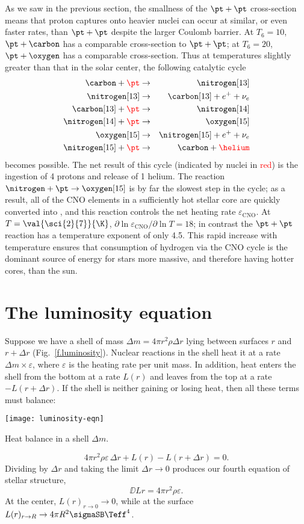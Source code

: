 As we saw in the previous section, the smallness of the $\pt+\pt$ cross-section means that proton captures onto heavier nuclei can occur at similar, or even faster rates, than $\pt+\pt$ despite the larger Coulomb barrier. 
At $T_{6} = 10$, $\pt+\carbon$ has a comparable cross-section to $\pt + \pt$; at $T_{6} = 20$, $\pt+\oxygen$ has a comparable cross-section.
Thus at temperatures slightly greater than that in the solar center, the following catalytic cycle 
\begin{eqnarray*}
\carbon + {\color{red}\pt} &\to& \nitrogen[13]\\
\nitrogen[13] &\to& \carbon[13] + e^{+} + \nu_{e}\\
\carbon[13] + {\color{red}\pt} &\to& \nitrogen[14]\\
\nitrogen[14] + {\color{red}\pt} &\to& \oxygen[15]\\
\oxygen[15] &\to& \nitrogen[15] + e^{+} + \nu_{e}\\
\nitrogen[15] + {\color{red}\pt} &\to& \carbon + {\color{red}\helium}
\end{eqnarray*}
becomes possible.
The net result of this cycle (indicated by nuclei in \textcolor{red}{red}) is the ingestion of 4 protons and release of 1 helium.
The reaction $\nitrogen+\pt\to\oxygen[15]$ is by far the slowest step in the cycle; as a result, all of the CNO elements in a sufficiently hot stellar core are quickly converted into \nitrogen, and this reaction controls the net heating rate $\varepsilon_{\mathrm{CNO}}$. At $T = \val{\sci{2}{7}}{\K}$, $\partial \ln \varepsilon_{\mathrm{CNO}}/\partial\ln T = 18$; in contrast the $\pt+\pt$ reaction has a temperature exponent of only 4.5. This rapid increase with temperature ensures that consumption of hydrogen via the CNO cycle is the dominant source of energy for stars more massive, and therefore having hotter cores, than the sun.


\section{The luminosity equation}

Suppose we have a shell of mass $\Delta m = 4\pi r^{2}\rho\Delta r$ lying between surfaces $r$ and $r+\Delta r$ (Fig.~\ref{f.luminosity}). Nuclear reactions in the shell heat it at a rate $\Delta m \times \varepsilon$, where $\varepsilon$ is the heating rate per unit mass.  In addition, heat enters the shell from the bottom at a rate $L(r)$ and leaves from the top at a rate $-L(r+\Delta r)$. If the shell is neither gaining or losing heat, then all these terms must balance:
\begin{marginfigure}
\texttt{[image: luminosity-eqn]}
\caption[Heat balance in a mass shell]{Heat balance in a shell $\Delta m$.}
\label{f.luminosity}
\end{marginfigure}
\[ 4\pi r^{2}\rho\varepsilon\,\Delta r + L(r) - L(r+\Delta r) = 0. \]
Dividing by $\Delta r$ and taking the limit $\Delta r \to 0$ produces our fourth equation of stellar structure,
\[
\DD{L}{r} = 4\pi r^{2}\rho\varepsilon.
\]
At the center, $L(r)_{r\to0}\to0$, while at the surface $L(r)_{r\to R}\to 4\pi R^{2}\sigmaSB\Teff^{4}$.



